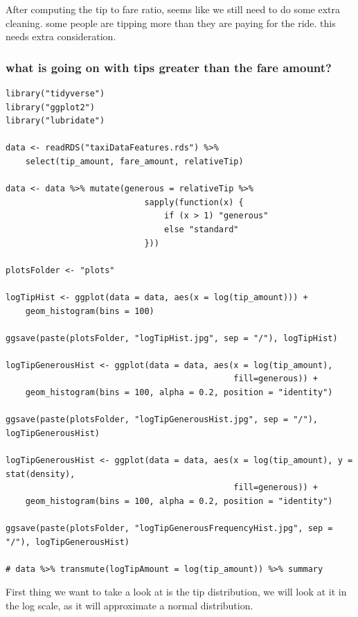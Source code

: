\documentclass[11pt]{article}
\begin{document}
After computing the tip to fare ratio, seems like we still need to do some extra cleaning.
some people are tipping more than they are paying for the ride. this needs extra consideration.


\subsubsection{what is going on with tips greater than the fare amount?}
\label{sec:orgadc424d}
\begin{verbatim}
library("tidyverse")
library("ggplot2")
library("lubridate")

data <- readRDS("taxiDataFeatures.rds") %>%
    select(tip_amount, fare_amount, relativeTip)

data <- data %>% mutate(generous = relativeTip %>%
                            sapply(function(x) {
                                if (x > 1) "generous"
                                else "standard"
                            }))

plotsFolder <- "plots"

logTipHist <- ggplot(data = data, aes(x = log(tip_amount))) +
    geom_histogram(bins = 100)

ggsave(paste(plotsFolder, "logTipHist.jpg", sep = "/"), logTipHist)

logTipGenerousHist <- ggplot(data = data, aes(x = log(tip_amount),
                                              fill=generous)) +
    geom_histogram(bins = 100, alpha = 0.2, position = "identity")

ggsave(paste(plotsFolder, "logTipGenerousHist.jpg", sep = "/"), logTipGenerousHist)

logTipGenerousHist <- ggplot(data = data, aes(x = log(tip_amount), y = stat(density),
                                              fill=generous)) +
    geom_histogram(bins = 100, alpha = 0.2, position = "identity")

ggsave(paste(plotsFolder, "logTipGenerousFrequencyHist.jpg", sep = "/"), logTipGenerousHist)

# data %>% transmute(logTipAmount = log(tip_amount)) %>% summary
\end{verbatim}
First thing we want to take a look at is the tip distribution, we will look
at it in the log scale, as it will approximate a normal distribution.
\end{document}
